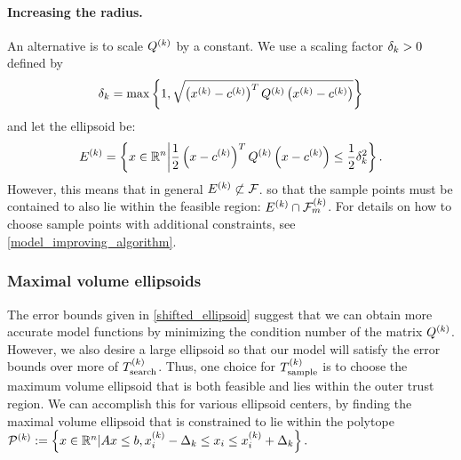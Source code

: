 \paragraph*{Increasing the radius.}
An alternative is to scale ${Q^{(k)}}$ by a constant.
We use a scaling factor $\delta_k > 0$ defined by
\begin{align*}
\delta_k = \max \left\{1, \sqrt{\left(x^{(k)} - c^{(k)} \right)^T {Q^{(k)}} \left(x^{(k)} - c^{(k)} \right)} \right\}
\end{align*}
and let the ellipsoid be:
\begin{align*}
{E^{(k)}} = \left\{x \in \mathbb R^n \bigg| \frac 1 2 \left(x - c^{(k)}\right)^T {Q^{(k)}} \left(x - c^{(k)}\right) \le \frac 1 2 \delta_k^2\right\}.
\end{align*}
However, this means that in general ${E^{(k)}} \not \subset {\mathcal F}$.
so that the sample points must be contained to also lie within the feasible region: ${E^{(k)}} \cap {\mathcal F_m^{(k)}}$.
For details on how to choose sample points with additional constraints, see \cref{model_improving_algorithm}.




\pagebreak
\subsubsection{Maximal volume ellipsoids}
\label{ellipse_optimization}

The error bounds given in \cref{shifted_ellipsoid} suggest that we can obtain more accurate model functions by 
minimizing the condition number of the matrix ${Q^{(k)}}$.
However, we also desire a large ellipsoid so that our model will satisfy the error bounds over more of ${T_{\text{search}}^{(k)}}$.
Thus, one choice for ${T_{\text{sample}}^{(k)}}$ is to choose the maximum volume ellipsoid that is both feasible and lies within the outer trust region.
We can accomplish this for various ellipsoid centers, by finding the maximal volume ellipsoid that is constrained to lie within the polytope
${{\mathcal{P}}^{(k)}} := \left\{x \in \mathbb R^n | {A} x\le {b},   x_i^{(k)} - \Delta_k \le x_i \le x_i^{(k)} + \Delta_k\right\}.$

